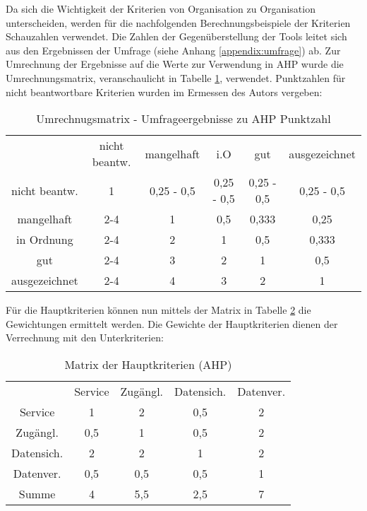 Da sich die Wichtigkeit der Kriterien von Organisation zu Organisation unterscheiden, werden für die nachfolgenden Berechnungsbeispiele der Kriterien Schauzahlen verwendet. Die Zahlen der Gegenüberstellung der Tools leitet sich aus den Ergebnissen der Umfrage (siehe Anhang \ref{appendix:umfrage}) ab. Zur Umrechnung der Ergebnisse auf die Werte zur Verwendung in AHP wurde die Umrechnungsmatrix, veranschaulicht in Tabelle \ref{tab:umrechMatrix}, verwendet. Punktzahlen für nicht beantwortbare Kriterien wurden im Ermessen des Autors vergeben:

\begin{table}[h]
	\centering
  \begin{tabular}{cccccc}
    & nicht beantw. & mangelhaft & i.O & gut & ausgezeichnet \\
    nicht beantw. & 1 & 0,25 - 0,5 & 0,25 - 0,5 & 0,25 - 0,5 & 0,25 - 0,5 \\
    mangelhaft & 2-4 & 1 & 0,5 & 0,333 & 0,25 \\
    in Ordnung & 2-4 & 2 & 1 & 0,5 & 0,333 \\
    gut & 2-4 & 3 & 2 & 1 & 0,5 \\
    ausgezeichnet & 2-4 & 4 & 3 & 2 & 1 \\
    \end{tabular} 
	\caption{Umrechnugsmatrix - Umfrageergebnisse zu AHP Punktzahl}
	\label{tab:umrechMatrix}
\end{table}

Für die Hauptkriterien können nun mittels der Matrix in Tabelle \ref{tab:MatrixHauptkriterien} die Gewichtungen ermittelt werden. Die Gewichte der Hauptkriterien dienen der Verrechnung mit den Unterkriterien: 

\begin{table}[h]
	\centering
\begin{tabular}{ccccc}
  & Service & Zugängl. & Datensich. & Datenver. \\
  Service & 1 & 2 & 0,5 & 2 \\
  Zugängl. & 0,5 & 1 & 0,5 & 2 \\
  Datensich. & 2 & 2 & 1 & 2 \\
  Datenver. & 0,5 & 0,5 & 0,5 & 1 \\
  Summe & 4 & 5,5 & 2,5 & 7 \\
  \end{tabular} 
	\caption{ Matrix der Hauptkriterien (AHP)}
	\label{tab:MatrixHauptkriterien}
\end{table}

